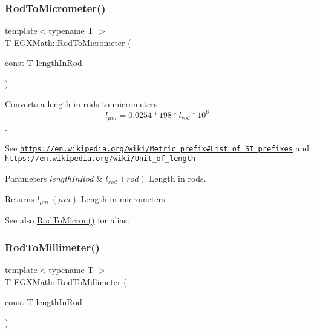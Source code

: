 \subsubsection{\texorpdfstring{Rod\+To\+Micrometer()}{RodToMicrometer()}}
{\footnotesize\ttfamily template$<$typename T $>$ \\
T E\+G\+X\+Math\+::\+Rod\+To\+Micrometer (\begin{DoxyParamCaption}\item[{const T}]{length\+In\+Rod }\end{DoxyParamCaption})}



Converts a length in rods to micrometers. \[ l_{\mu m}=0.0254 * 198 * l_{rod} * 10^{6} \]. 

See \href{https://en.wikipedia.org/wiki/Metric_prefix#List_of_SI_prefixes}{\tt https\+://en.\+wikipedia.\+org/wiki/\+Metric\+\_\+prefix\#\+List\+\_\+of\+\_\+\+S\+I\+\_\+prefixes} and \href{https://en.wikipedia.org/wiki/Unit_of_length}{\tt https\+://en.\+wikipedia.\+org/wiki/\+Unit\+\_\+of\+\_\+length} 
\begin{DoxyParams}{Parameters}
{\em length\+In\+Rod} & $ l_{rod}\ (rod)$ Length in rods. \\
\hline
\end{DoxyParams}
\begin{DoxyReturn}{Returns}
$ l_{\mu m}\ (\mu m)$ Length in micrometers. 
\end{DoxyReturn}
\begin{DoxySeeAlso}{See also}
\mbox{\hyperlink{group___e_g_x_math-_conversions-_length_conversions-_imperial-_rod-_non-_s_i_ga91daf7bb89d486f6c8523a5436e5599d}{Rod\+To\+Micron()}} for alias. 
\end{DoxySeeAlso}
\mbox{\label{group___e_g_x_math-_conversions-_length_conversions-_imperial-_rod-_s_i_gac99fbcf597375add3d57bcf16d64a890}} 
\subsubsection{\texorpdfstring{Rod\+To\+Millimeter()}{RodToMillimeter()}}
{\footnotesize\ttfamily template$<$typename T $>$ \\
T E\+G\+X\+Math\+::\+Rod\+To\+Millimeter (\begin{DoxyParamCaption}\item[{const T}]{length\+In\+Rod }\end{DoxyParamCaption})}



